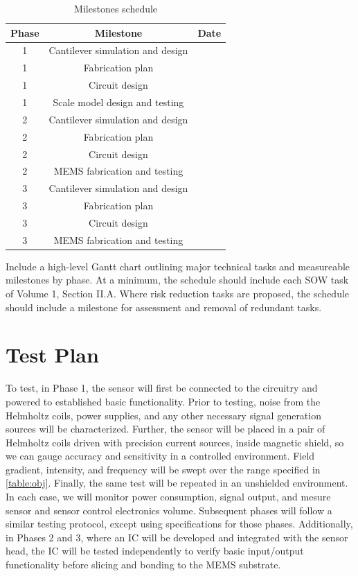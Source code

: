 \begin{table}[h!]
\centering
  \begin{tabular}{|c||c|c|}
    \hline
    Phase & Milestone & Date\\
    \hline
    \hline
    1 & Cantilever simulation and design & \\
    \hline
    1 & Fabrication plan & \\
    \hline
    1 & Circuit design & \\
    \hline
    1 & Scale model design and testing & \\
    \hline
    \hline
    2 & Cantilever simulation and design & \\
    \hline
    2 & Fabrication plan & \\
    \hline
    2 & Circuit design & \\
    \hline
    2 & MEMS fabrication and testing & \\
    \hline
    \hline
    3 & Cantilever simulation and design & \\
    \hline
    3 & Fabrication plan & \\
    \hline
    3 & Circuit design & \\
    \hline
    3 & MEMS fabrication and testing & \\
    \hline
  \end{tabular}
\caption{Milestones schedule}
\label{table:sched}
\end{table}

Include a high-level Gantt chart outlining major technical tasks and measureable milestones
by phase. At a minimum, the schedule should include each SOW task of Volume 1, Section
II.A. Where risk reduction tasks are proposed, the schedule should include a milestone for
assessment and removal of redundant tasks.

\section{Test Plan}

To test, in Phase 1, the sensor will first be connected to the circuitry and powered to established basic functionality.  Prior to testing, noise from the Helmholtz coils, power supplies, and any other necessary signal generation sources will be characterized. Further, the sensor will be placed in a pair of Helmholtz coils driven with precision current sources, inside magnetic shield, so we can gauge accuracy and sensitivity in a controlled environment. Field gradient, intensity, and frequency will be swept over the range specified in \ref{table:obj}. Finally, the same test will be repeated in an unshielded environment. In each case, we will monitor power consumption, signal output, and mesure sensor and sensor control electronics volume. Subsequent phases will follow a similar testing protocol, except using specifications for those phases. Additionally, in Phases 2 and 3, where an IC will be developed and integrated with the sensor head, the IC will be tested independently to verify basic input/output functionality before slicing and bonding to the MEMS substrate.

